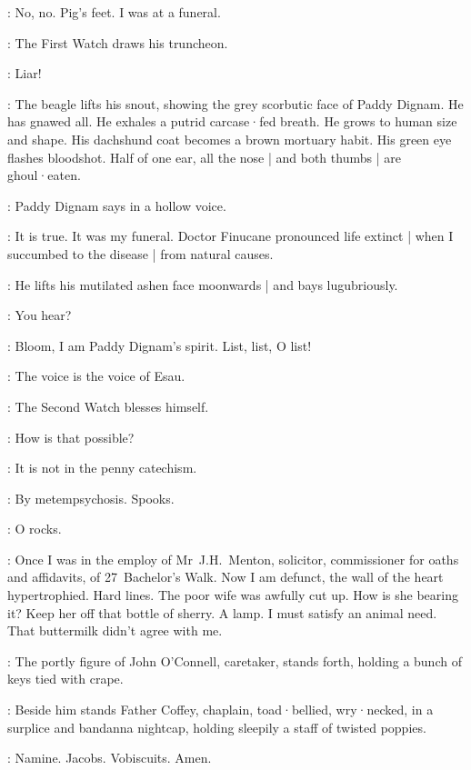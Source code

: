 \Bloom:
No,
no.
Pig's feet.
I was at a funeral.

:
The First Watch draws his truncheon.

\FirstWatch:
Liar!

:
The beagle lifts his snout,
showing the grey scorbutic face of Paddy Dignam.
He has gnawed all.
He exhales a putrid carcase·fed breath.
He grows to human size and shape.
His dachshund coat becomes a brown mortuary habit.
His green eye flashes bloodshot.
Half of one ear,
all the nose |
and both thumbs |
are ghoul·eaten.

:
Paddy Dignam says in a hollow voice.

\Dignam:
It is true.
It was my funeral.
Doctor Finucane pronounced life extinct |
when I succumbed to the disease |
from natural causes.

:
He lifts his mutilated ashen face moonwards |
and bays lugubriously.

\Bloom:
You hear?

\Dignam:
Bloom,
I am Paddy Dignam's spirit.
List,
list,
O list!

\Bloom:
The voice is the voice of Esau.

:
The Second Watch blesses himself.

\SecondWatch:
How is that possible?

\FirstWatch:
It is not in the penny catechism.

\Dignam:
By metempsychosis.
Spooks.

\Voice:
O rocks.

\Dignam:
Once I was in the employ of Mr~J.H.~Menton,
solicitor,
commissioner for oaths and affidavits,
of 27~Bachelor's Walk.
Now I am defunct,
the wall of the heart hypertrophied.
Hard lines.
The poor wife was awfully cut up.
How is she bearing it?
Keep her off that bottle of sherry.
A lamp.
I must satisfy an animal need.
That buttermilk didn't agree with me.

:
The portly figure of John O'Connell,
caretaker,
stands forth,
holding a bunch of keys tied with crape.

:
Beside him stands Father Coffey,
chaplain,
toad·bellied,
wry·necked,
in a surplice and bandanna nightcap,
holding sleepily a staff of twisted poppies.

\FrCoffey:
Namine.
Jacobs.
Vobiscuits.
Amen.

